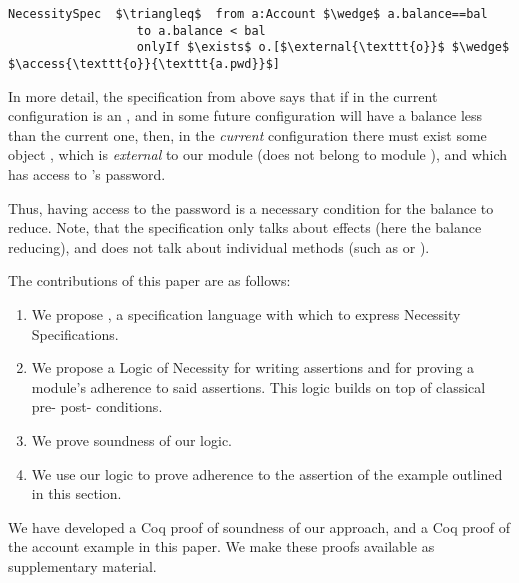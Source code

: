  \begin{lstlisting}[language = Chainmail, mathescape=true, frame=lines]
NecessitySpec  $\triangleq$  from a:Account $\wedge$ a.balance==bal
                  to a.balance < bal
                  onlyIf $\exists$ o.[$\external{\texttt{o}}$ $\wedge$ $\access{\texttt{o}}{\texttt{a.pwd}}$]
\end{lstlisting}
 
  
 In more detail, the specification from above says that if in the current
 configuration  is an ,
 and in some future configuration  will have a balance less than the current one, then, in the \emph{current} configuration
 there must exist some object , which is \emph{external} to our module (does not belong to module
 ), and which has access to 's password.
 
 
 Thus, having access to the password is a necessary condition for the balance to reduce.
 Note, that the specification only talks about effects (here the balance reducing), and does not
 talk about individual methods (such as  or ).
 
   
 The contributions of this paper are as follows:
 
 \begin{enumerate}
 \item
 We propose \Chainmail, a specification language with which to
express Necessity Specifications. 
 \item
  We propose a Logic of Necessity for writing assertions and for proving a module's adherence to said assertions.
 This logic builds on top of classical pre- post- conditions.
 \item
 We prove soundness of our logic.  
 \item
 We use our logic to prove adherence to the assertion of the example
outlined  in this section.
 \end{enumerate}
 
 We have developed a Coq proof of soundness of our approach, and a Coq proof of the
 account example in this paper. We make these proofs available as supplementary material.


